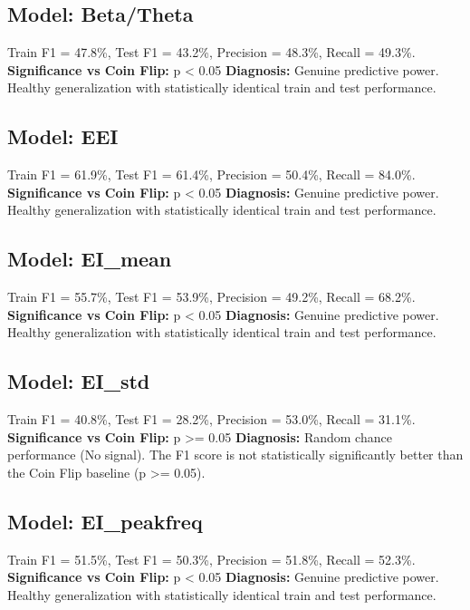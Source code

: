 \subsection*{Model: Beta/Theta}
Train F1 = 47.8\%, Test F1 = 43.2\%, Precision = 48.3\%, Recall = 49.3\%.
\newline
\textbf{Significance vs Coin Flip:} p < 0.05
\newline
\textbf{Diagnosis:} Genuine predictive power. Healthy generalization with statistically identical train and test performance.

\subsection*{Model: EEI}
Train F1 = 61.9\%, Test F1 = 61.4\%, Precision = 50.4\%, Recall = 84.0\%.
\newline
\textbf{Significance vs Coin Flip:} p < 0.05
\newline
\textbf{Diagnosis:} Genuine predictive power. Healthy generalization with statistically identical train and test performance.

\subsection*{Model: EI_mean}
Train F1 = 55.7\%, Test F1 = 53.9\%, Precision = 49.2\%, Recall = 68.2\%.
\newline
\textbf{Significance vs Coin Flip:} p < 0.05
\newline
\textbf{Diagnosis:} Genuine predictive power. Healthy generalization with statistically identical train and test performance.

\subsection*{Model: EI_std}
Train F1 = 40.8\%, Test F1 = 28.2\%, Precision = 53.0\%, Recall = 31.1\%.
\newline
\textbf{Significance vs Coin Flip:} p >= 0.05
\newline
\textbf{Diagnosis:} Random chance performance (No signal). The F1 score is not statistically significantly better than the Coin Flip baseline (p >= 0.05).

\subsection*{Model: EI_peakfreq}
Train F1 = 51.5\%, Test F1 = 50.3\%, Precision = 51.8\%, Recall = 52.3\%.
\newline
\textbf{Significance vs Coin Flip:} p < 0.05
\newline
\textbf{Diagnosis:} Genuine predictive power. Healthy generalization with statistically identical train and test performance.

